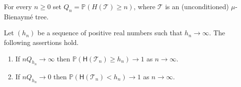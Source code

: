 \documentclass[a4paper,11pt]{article}
\DeclareRobustCommand{\P}{\mathbb{P}}
\begin{document}
For every $n \geq 0$ set 
$Q_n = \P(H(\mathcal{T})\geq n)$,
where $ \mathcal{T} $ is an (unconditioned) $\mu$-Bienaymé tree.



\begin{proposition}
\label{prop:height}
Let $(h_{n})$ be a sequence of positive real numbers such that $h_{n} \rightarrow \infty$. The following assertions hold.
\begin{enumerate}
\item[(i)] If $n Q_{ h_{n}} \rightarrow \infty$ then $\P(\mathsf{H}(\mathcal{T}_n) \geq  h_{n}) \rightarrow 1$ as $n \rightarrow \infty$.
\item[(ii)] If $n Q_{ h_{n}} \rightarrow 0$ then $\P(\mathsf{H}(\mathcal{T}_n) < h_{n}) \rightarrow 1$ as $n \rightarrow \infty$.
\end{enumerate}
\end{proposition}
\end{document}
